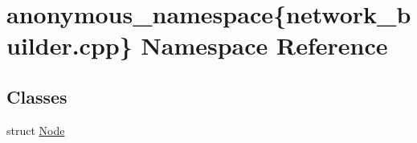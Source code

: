 \hypertarget{namespaceanonymous__namespace_02network__builder_8cpp_03}{\section{anonymous\-\_\-namespace\{network\-\_\-builder.\-cpp\} Namespace Reference}
\label{namespaceanonymous__namespace_02network__builder_8cpp_03}
}
\subsection*{Classes}
\begin{DoxyCompactItemize}
\item 
struct \hyperlink{structanonymous__namespace_02network__builder_8cpp_03_1_1Node}{Node}
\end{DoxyCompactItemize}
